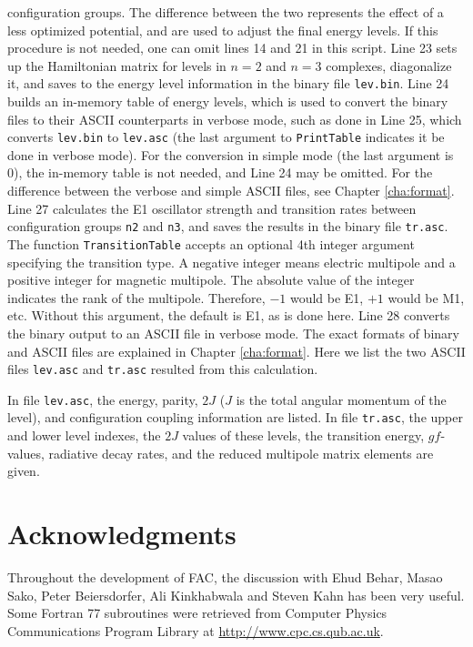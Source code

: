 configuration groups. The difference between the two represents the effect of
a less optimized potential, and are used to adjust the final energy levels. If
this procedure is not needed, one can omit lines 14 and 21 in this script. Line
23 sets up the Hamiltonian matrix for levels in $n = 2$ and $n = 3$ complexes,
diagonalize it, and saves to the energy level information in the binary file
\verb|lev.bin|. Line 24 builds an in-memory table of energy levels, which is
used to convert the binary files to their ASCII counterparts in verbose mode,
such as done in Line 25, which converts \verb|lev.bin| to \verb|lev.asc| (the
last argument to \verb|PrintTable| indicates it be done in verbose mode). For
the conversion in simple mode (the last argument is 0), the in-memory table is
not needed, and Line 24 may be omitted. For the difference between the verbose
and simple ASCII files, see Chapter \ref{cha:format}. Line 27 calculates the
E1 oscillator strength and transition rates between configuration groups
\verb|n2| and \verb|n3|, and saves the results in the binary file
\verb|tr.asc|. The function \verb|TransitionTable| accepts an optional 4th
integer argument specifying the transition type. A negative integer means
electric multipole and a positive integer for magnetic multipole. The absolute
value of the integer indicates the rank of the multipole. Therefore, $-1$ would
be E1, $+1$ would be M1, etc. Without this argument, the default is E1, as is
done here. Line 28 converts the binary output to an ASCII file in verbose
mode. The exact formats of binary and ASCII files are explained in Chapter
\ref{cha:format}. Here we list the two ASCII files \verb|lev.asc| and
\verb|tr.asc| resulted from this calculation. 

\lstset{numbers=none,basicstyle=\scriptsize,caption=demo/structure/lev.asc}

\lstset{numbers=none,basicstyle=\normalsize,caption=demo/structure/tr.asc}

In file \verb|lev.asc|, the energy, parity, $2J$ ($J$ is the total
angular momentum of the level), and configuration coupling information are
listed. In file \verb|tr.asc|, the upper and lower level indexes, the $2J$
values of these levels, the transition energy, $gf$-values, radiative
decay rates, and the reduced multipole matrix elements are given.

\section*{Acknowledgments}
Throughout the development of FAC, the discussion with Ehud Behar, Masao
Sako, Peter Beiersdorfer, Ali Kinkhabwala and Steven Kahn has been very
useful. Some Fortran 77 subroutines were retrieved from Computer Physics
Communications Program Library at
\url{http://www.cpc.cs.qub.ac.uk}.

